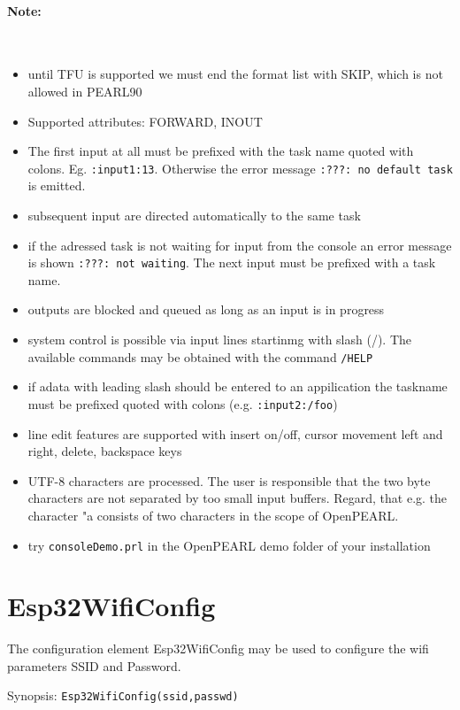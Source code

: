 \paragraph{Note:}\ 
\begin{itemize}
\item until TFU is supported we must end the format list with SKIP, 
   which is not allowed in PEARL90
\item Supported attributes: FORWARD, INOUT
\item The first input at all must be prefixed with the task name
 quoted with colons. Eg. \verb|:input1:13|. Otherwise the error message
 \verb|:???: no default task| is emitted.
\item subsequent input are directed automatically to the same task
\item if the adressed task is not waiting for input from the console an
  error message is shown \verb|:???: not waiting|. The next input must be 
  prefixed with a task name.
\item outputs are blocked and queued as long as an input is in progress
\item system control is possible via input lines startinmg with slash (/).
  The available commands may be obtained with the command \verb|/HELP|
\item if adata with leading slash should  be entered to an appilication
   the taskname must be prefixed quoted with colons (e.g. \verb|:input2:/foo|)
\item line edit features are supported with 
   insert on/off, cursor movement left and right, delete, backspace keys
\item UTF-8 characters are processed. The user is responsible that 
   the two byte characters are not separated by too small input buffers.
   Regard, that e.g. the character "a consists of  two characters in the 
   scope of OpenPEARL.
\item try \verb|consoleDemo.prl|  in the OpenPEARL demo folder of your installation
\end{itemize}


\section{Esp32WifiConfig}
\label{esp32wificonfig}

The configuration element Esp32WifiConfig may be used to configure the
wifi parameters SSID and Password.

Synopsis: \verb|Esp32WifiConfig(ssid,passwd)|

